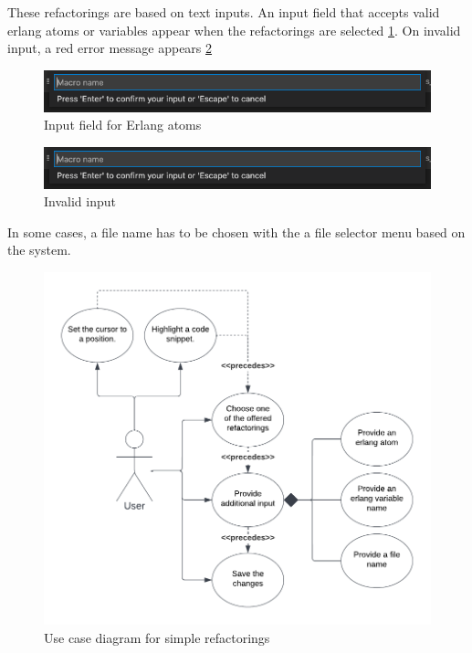These refactorings are based on text inputs. An input field that accepts valid erlang atoms or variables appear when the refactorings are selected \ref{fig:input}. On invalid input, a red error message appears \ref{fig:input-invalid}

\begin{figure}[H]
	\centering
	\includegraphics[width=1\textwidth]{images/valid_input.png}
	\caption{Input field for Erlang atoms}
	\label{fig:input}
\end{figure}

\begin{figure}[H]
	\centering
	\includegraphics[width=1\textwidth]{images/valid_input.png}
	\caption{Invalid input}
	\label{fig:input-invalid}
\end{figure}


In some cases, a file name has to be chosen with the a file selector menu based on the system.

\begin{figure}[H]
	\centering
	\includegraphics[width=1\textwidth]{images/use_case_1.png}
	\caption{Use case diagram for simple refactorings}
	\label{fig:usecase}
\end{figure}

